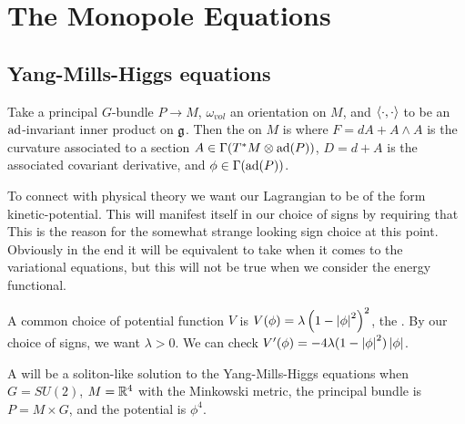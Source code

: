 \documentclass{article}
\begin{document}
\section{The Monopole Equations}
\subsection{Yang-Mills-Higgs equations}
\begin{definition}
Take a principal $G$-bundle $P\to M$, $\omega_{vol}$ an orientation on $M$, and $\left\langle \cdot, \cdot \right\rangle$ to be an $\operatorname{ad}$-invariant inner product on $\mathfrak{g}$. Then the  on $M$ is 
where $F=dA+A\wedge A$ is the curvature associated to a section $A\in \Gamma(T^\ast M \otimes \operatorname{ad}(P))$, $D = d+A$ is the associated covariant derivative, and $\phi \in \Gamma(\operatorname{ad}(P))$.
\end{definition}

To connect with physical theory we want our Lagrangian to be of the form kinetic-potential. This will manifest itself in our choice of signs by requiring that 
This is the reason for the somewhat strange looking sign choice at this point. Obviously in the end it will be equivalent to take 
when it comes to the variational equations, but this will not be true when we consider the energy functional.
\begin{remark}
	A common choice of potential function $V$ is $V(\phi) = \lambda \left( 1-\left\lvert \phi \right\rvert^2 \right)^2$, the . By our choice of signs, we want $\lambda >0$. We can check $V^\prime(\phi) = -4\lambda(1-\left\lvert \phi \right\rvert^2)\left\lvert \phi \right\rvert$. 
\end{remark}

\begin{definition}
	A  will be a soliton-like solution to the Yang-Mills-Higgs equations when $G=SU(2)$, $M=\mathbb{R}^4$ with the Minkowski metric, the principal bundle is $P = M \times G$, and the potential is $\phi^4$. 
\end{definition}
\end{document}
